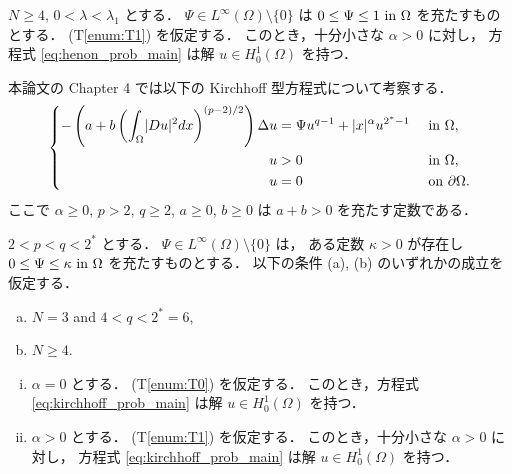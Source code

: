 \begin{thm}[Theorem 1.1.1] \label{thm:henon_main}
  $N \geq 4$, $0 < \lambda < \lambda_1$ とする．
  $\Psi \in L^\infty(\Omega) \setminus \{ 0 \}$
  は $0 \leq \Psi \leq 1 \text{ in } \Omega$ を充たすものとする．
  (T\ref{enum:T1}) を仮定する．
  このとき，十分小さな $\alpha > 0$ に対し，
  方程式 \eqref{eq:henon_prob_main}
  は解 $u \in H_0^1(\Omega)$ を持つ．
\end{thm}

本論文の Chapter 4 では以下の Kirchhoff 型方程式について考察する．
\begin{align}
  \left\{
  \begin{aligned}
    - \left( a + b \left( \int_\Omega \lvert Du \rvert^2 dx \right)^{(p-2)/2} \right) \Delta u &= \Psi u^{q-1} + \lvert x \rvert^\alpha u^{2^* - 1}
               &                                                     & \text{ in } \Omega,                        \\
    u          & > 0                                                 &              & \text{ in } \Omega,         \\
    u          & = 0                                                 &              & \text{ on } \partial\Omega.
  \end{aligned}
  \right. \label{eq:kirchhoff_prob_main}
\end{align}
ここで $\alpha \geq 0$, $p > 2$, $q \geq 2$, $a \geq 0$, $b \geq 0$
は $a + b > 0$ を充たす定数である．

\begin{thm}[Theorem~1.1.2] \label{thm:kirchhoff_main}
  $2 < p < q < 2^*$ とする．
  $\Psi \in L^\infty(\Omega) \setminus \{ 0 \}$ は，
  ある定数 $\kappa > 0$ が存在し
  $0 \leq \Psi \leq \kappa \text{ in } \Omega$
  を充たすものとする．
  以下の条件 (a), (b) のいずれかの成立を仮定する．
  \begin{enumerate}[(a)]
    \item $N = 3$ and $4 < q < 2^* = 6$,
    \item $N \geq 4$.
  \end{enumerate}
  \begin{enumerate}[(i)]
    \item
      $\alpha = 0$ とする． (T\ref{enum:T0}) を仮定する．
      このとき，方程式 \eqref{eq:kirchhoff_prob_main}
      は解 $u \in H_0^1(\Omega)$ を持つ．
    \item
      $\alpha > 0$ とする． (T\ref{enum:T1}) を仮定する．
      このとき，十分小さな $\alpha > 0$ に対し，
      方程式 \eqref{eq:kirchhoff_prob_main}
      は解 $u \in H_0^1(\Omega)$ を持つ．
  \end{enumerate}
\end{thm}

